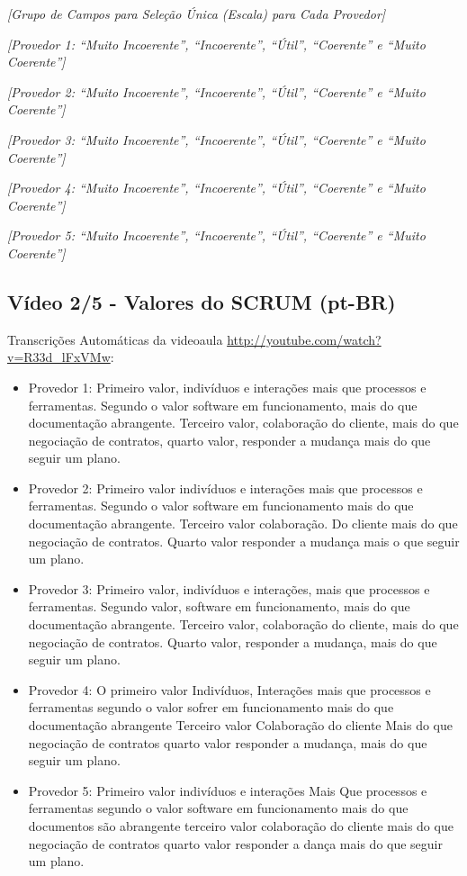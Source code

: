 \noindent
\textit{[Grupo de Campos para Seleção Única (Escala) para Cada Provedor]}

\noindent
\textit{[Provedor 1: ``Muito Incoerente'', ``Incoerente'', ``Útil'', ``Coerente'' e ``Muito Coerente'']}

\noindent
\textit{[Provedor 2: ``Muito Incoerente'', ``Incoerente'', ``Útil'', ``Coerente'' e ``Muito Coerente'']}

\noindent
\textit{[Provedor 3: ``Muito Incoerente'', ``Incoerente'', ``Útil'', ``Coerente'' e ``Muito Coerente'']}

\noindent
\textit{[Provedor 4: ``Muito Incoerente'', ``Incoerente'', ``Útil'', ``Coerente'' e ``Muito Coerente'']}

\noindent
\textit{[Provedor 5: ``Muito Incoerente'', ``Incoerente'', ``Útil'', ``Coerente'' e ``Muito Coerente'']}

\subsection{Vídeo 2/5 - Valores do SCRUM (pt-BR)}

\noindent
Transcrições Automáticas da videoaula \url{http://youtube.com/watch?v=R33d_lFxVMw}:

\begin{itemize}
    \item Provedor 1: Primeiro valor, indivíduos e interações mais que processos e ferramentas. Segundo o valor software em funcionamento, mais do que documentação abrangente. Terceiro valor, colaboração do cliente, mais do que negociação de contratos, quarto valor, responder a mudança mais do que seguir um plano.
    \item Provedor 2: Primeiro valor indivíduos e interações mais que processos e ferramentas. Segundo o valor software em funcionamento mais do que documentação abrangente. Terceiro valor colaboração. Do cliente mais do que negociação de contratos. Quarto valor responder a mudança mais o que seguir um plano.
    \item Provedor 3: Primeiro valor, indivíduos e interações, mais que processos e ferramentas. Segundo valor, software em funcionamento, mais do que documentação abrangente. Terceiro valor, colaboração do cliente, mais do que negociação de contratos. Quarto valor, responder a mudança, mais do que seguir um plano.
    \item Provedor 4: O primeiro valor Indivíduos, Interações mais que processos e ferramentas segundo o valor sofrer em funcionamento mais do que documentação abrangente Terceiro valor Colaboração do cliente Mais do que negociação de contratos quarto valor responder a mudança, mais do que seguir um plano.
    \item Provedor 5: Primeiro valor indivíduos e interações Mais Que processos e ferramentas segundo o valor software em funcionamento mais do que documentos são abrangente terceiro valor colaboração do cliente mais do que negociação de contratos quarto valor responder a dança mais do que seguir um plano.
\end{itemize}


